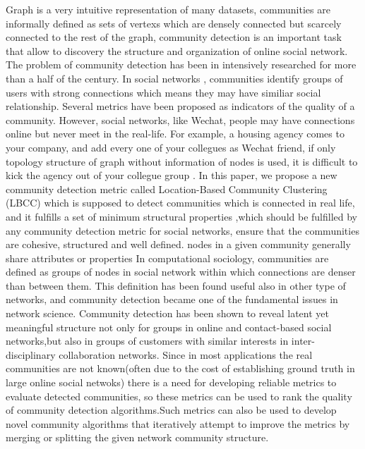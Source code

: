 Graph is a very intuitive representation of many datasets,
communities are informally defined as sets of vertexs which are densely connected but scarcely connected to the rest of the  graph,
community detection is an important task that allow  to discovery the structure and organization of online social network.
The problem of community detection has been in intensively researched for more than a half of the century.
In social networks , communities identify groups of users with strong connections which means they may have similiar social relationship.
Several metrics have been proposed as indicators of the quality of a community.
However, social networks, like Wechat, people may have connections online but never meet in the real-life. 
For example, a housing agency comes to your company, and add every one of your collegues as Wechat friend, 
if  only topology structure of graph without information of nodes is used, it is difficult to kick the agency out of your collegue group .
In this paper, we propose a new community detection metric called Location-Based Community Clustering (LBCC) 
which is supposed to detect communities which is connected in real life, and it fulfills a set of minimum structural properties ,which should
be  fulfilled by any community detection metric for social networks, ensure  that the communities are cohesive, structured and well defined.
nodes in a given community generally share attributes or properties
In computational sociology, communities are defined as groups of nodes in social network within which connections are denser than between them. This definition has been found useful also in other type of networks, and community detection became one of the fundamental issues in network science. Community detection has been shown to reveal latent yet meaningful structure not only for groups in online and contact-based social networks,but also in groups of customers with similar interests in inter-disciplinary collaboration networks.
Since in most applications the real communities are not known(often due to the cost of establishing ground truth in large online social netwoks) there is a need for developing reliable metrics to evaluate detected communities, so these metrics can be used to rank the quality of community detection algorithms.Such metrics can also be used to develop novel community algorithms that iteratively attempt to improve the metrics by merging or splitting the given network community structure.

